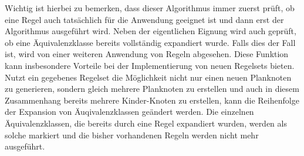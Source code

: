 Wichtig ist hierbei zu bemerken, dass dieser Algorithmus immer zuerst prüft, ob eine Regel auch tatsächlich für die Anwendung geeignet ist und dann erst der Algorithmus ausgeführt wird. Neben der eigentlichen Eignung wird auch geprüft, ob eine Äquivalenzklasse bereits vollständig expandiert wurde. Falls dies der Fall ist, wird von einer weiteren Anwendung von Regeln abgesehen. Diese Funktion kann insbesondere Vorteile bei der Implementierung von neuen Regelsets bieten. Nutzt ein gegebenes Regelset die Möglichkeit nicht nur einen neuen Planknoten zu generieren, sondern gleich mehrere Planknoten zu erstellen und auch in diesem Zusammenhang bereits mehrere Kinder-Knoten zu erstellen, kann die Reihenfolge der Expansion von Äuqivalenzklassen geändert werden. Die einzelnen Äquivalenzklassen, die bereits durch eine Regel expandiert wurden, werden als solche markiert und die bisher vorhandenen Regeln werden nicht mehr ausgeführt.















